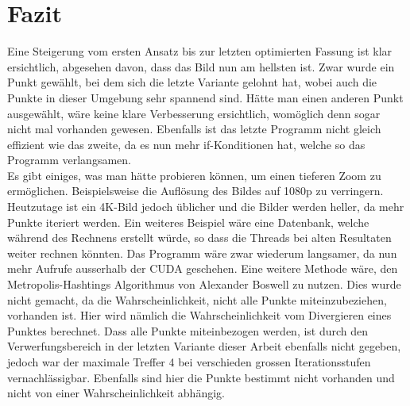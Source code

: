 \section{Fazit}
Eine Steigerung vom ersten Ansatz bis zur letzten optimierten Fassung ist klar ersichtlich, abgesehen davon, dass das Bild nun am hellsten ist. Zwar wurde ein Punkt gewählt, bei dem sich die letzte Variante gelohnt hat, wobei auch die Punkte in dieser Umgebung sehr spannend sind. Hätte man einen anderen Punkt ausgewählt, wäre keine klare Verbesserung ersichtlich, womöglich denn sogar nicht mal vorhanden gewesen. Ebenfalls ist das letzte Programm nicht gleich effizient wie das zweite, da es nun mehr if-Konditionen hat, welche so das Programm verlangsamen.\\
Es gibt einiges, was man hätte probieren können, um einen tieferen Zoom zu ermöglichen. Beispielsweise die Auflösung des Bildes auf 1080p zu verringern. Heutzutage ist ein 4K-Bild jedoch üblicher und die Bilder werden heller, da mehr Punkte iteriert werden. Ein weiteres Beispiel wäre eine Datenbank, welche während des Rechnens erstellt würde, so dass die Threads bei alten Resultaten weiter rechnen könnten. Das Programm wäre zwar wiederum langsamer, da nun mehr Aufrufe ausserhalb der CUDA geschehen. Eine weitere Methode wäre, den Metropolis-Hashtings Algorithmus von Alexander Boswell zu nutzen. Dies wurde nicht gemacht, da die Wahrscheinlichkeit, nicht alle Punkte miteinzubeziehen, vorhanden ist. Hier wird nämlich die Wahrscheinlichkeit vom Divergieren eines Punktes berechnet. Dass alle Punkte miteinbezogen werden, ist durch den Verwerfungsbereich in der letzten Variante dieser Arbeit ebenfalls nicht gegeben, jedoch war der maximale Treffer 4 bei verschieden grossen Iterationsstufen vernachlässigbar. Ebenfalls sind hier die Punkte bestimmt nicht vorhanden und nicht von einer Wahrscheinlichkeit abhängig.